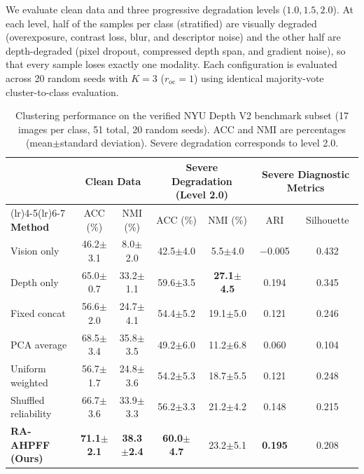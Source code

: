 \documentclass[11pt, a4paper]{article}
\begin{document}
We evaluate clean data and three progressive degradation levels ($1.0, 1.5, 2.0$). At each level, half of the samples per class (stratified) are visually degraded (overexposure, contrast loss, blur, and descriptor noise) and the other half are depth-degraded (pixel dropout, compressed depth span, and gradient noise), so that every sample loses exactly one modality. Each configuration is evaluated across 20 random seeds with $K=3$ ($r_{\text{oc}}=1$) using identical majority-vote cluster-to-class evaluation.

\begin{table}[htbp]
    \centering
    \caption{Clustering performance on the verified NYU Depth V2 benchmark subset (17 images per class, 51 total, 20 random seeds). ACC and NMI are percentages (mean$\pm$standard deviation). Severe degradation corresponds to level 2.0.}
    \label{tab:nyu_ablation}
    \footnotesize
    \setlength{\tabcolsep}{4.5pt}
    \begin{tabularx}{\textwidth}{>{\raggedright\arraybackslash}X cccccc}
        \toprule
        & \multicolumn{2}{c}{\textbf{Clean Data}} & \multicolumn{2}{c}{\textbf{Severe Degradation (Level 2.0)}} & \multicolumn{2}{c}{\textbf{Severe Diagnostic Metrics}} \\
        \cmidrule(lr){2-3}\cmidrule(lr){4-5}\cmidrule(lr){6-7}
        \textbf{Method} & ACC (\%) & NMI (\%) & ACC (\%) & NMI (\%) & ARI & Silhouette \\
        \midrule
        Vision only & 46.2$\pm$3.1 & 8.0$\pm$2.0 & 42.5$\pm$4.0 & 5.5$\pm$4.0 & $-$0.005 & 0.432 \\
        Depth only & 65.0$\pm$0.7 & 33.2$\pm$1.1 & 59.6$\pm$3.5 & \textbf{27.1$\pm$4.5} & 0.194 & 0.345 \\
        Fixed concat & 56.6$\pm$2.0 & 24.7$\pm$4.1 & 54.4$\pm$5.2 & 19.1$\pm$5.0 & 0.121 & 0.246 \\
        PCA average & 68.5$\pm$3.4 & 35.8$\pm$3.5 & 49.2$\pm$6.0 & 11.2$\pm$6.8 & 0.060 & 0.104 \\
        Uniform weighted & 56.7$\pm$1.7 & 24.8$\pm$3.6 & 54.2$\pm$5.3 & 18.7$\pm$5.5 & 0.121 & 0.248 \\
        Shuffled reliability & 66.7$\pm$3.6 & 33.9$\pm$3.3 & 56.2$\pm$3.3 & 21.2$\pm$4.2 & 0.148 & 0.215 \\
        \textbf{RA-AHPFF (Ours)} & \textbf{71.1$\pm$2.1} & \textbf{38.3$\pm$2.4} & \textbf{60.0$\pm$4.7} & 23.2$\pm$5.1 & \textbf{0.195} & 0.208 \\
        \bottomrule
    \end{tabularx}
\end{table}
\end{document}
